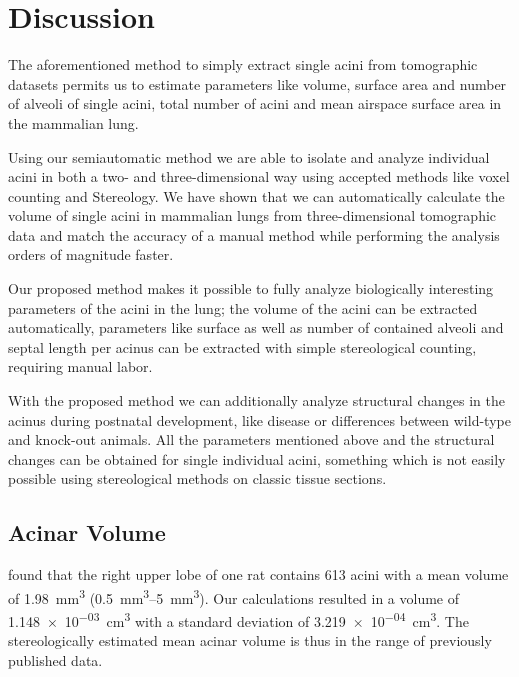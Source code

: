 \documentclass[a4paper,DIVcalc,abstract,english]{scrartcl}
\newcommand{\meanacinarvolume}{1.148e-03} %
\newcommand{\std}{3.219e-04} %
\begin{document}
\section{Discussion}
The aforementioned method to simply extract single acini from tomographic datasets permits us to estimate parameters like volume, surface area and number of alveoli of single acini, total number of acini and mean airspace surface area in the mammalian lung.

Using our semiautomatic method we are able to isolate and analyze individual acini in both a two- and three-dimensional way using accepted methods like voxel counting and Stereology.
We have shown that we can automatically calculate the volume of single acini in mammalian lungs from three-dimensional tomographic data and match the accuracy of a manual method while performing the analysis orders of magnitude faster.

Our proposed method makes it possible to fully analyze biologically interesting parameters of the acini in the lung; the volume of the acini can be extracted automatically, parameters like surface as well as number of contained alveoli and septal length per acinus can be extracted with simple stereological counting, requiring manual labor.

With the proposed method we can additionally analyze structural changes in the acinus during postnatal development, like disease or differences between wild-type and knock-out animals.
All the parameters mentioned above and the structural changes can be obtained for single individual acini, something which is not easily possible using stereological methods on classic tissue sections.

\subsection{Acinar Volume}
\citet{Rodriguez1987} found that the right upper lobe of one rat contains 613 acini with a mean volume of \SI{1.98}{\milli\meter\cubed} (\SIrange{0.5}{5}{\milli\meter\cubed}).
Our calculations resulted in a volume of \SI{\meanacinarvolume}{\cubic\centi\meter} with a standard deviation of \SI{\std}{\cubic\centi\meter}.
The stereologically estimated mean acinar volume is thus in the range of previously published data.
\end{document}

